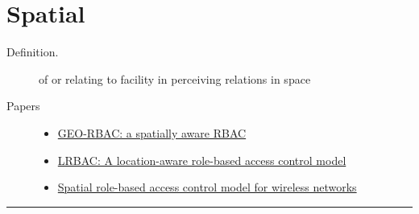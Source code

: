 \documentclass[letterpaper,10pt,english]{sphinxmanual}
\begin{document}
\chapter{Spatial}
\label{categories/spatial::doc}\label{categories/spatial:spatial}\begin{description}
\item[{Definition.}] \leavevmode
of or relating to facility in perceiving relations in space

\item[{Papers}] \leavevmode\begin{itemize}
\item {} 
\href{http://dl.acm.org/citation.cfm?id=1063985}{GEO-RBAC: a spatially aware RBAC}

\item {} 
\href{http://www.springerlink.com/index/4N6XK46321M574UH.pdf}{LRBAC: A location-aware role-based access control model}

\item {} 
\href{http://ieeexplore.ieee.org/xpls/abs\_all.jsp?arnumber=1285394}{Spatial role-based access control model for wireless networks}

\end{itemize}

\end{description}


\bigskip\hrule{}\bigskip
\end{document}
